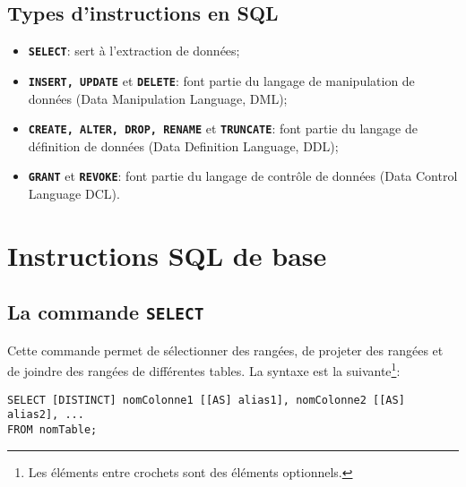 \documentclass[a4paper, 12pt]{report}
\newcommand{\textSQL}[1]{\texttt{\textbf{#1}}}
\theoremstyle{definition} \newtheorem{ex}{Exemple}
\begin{document}
\section[Instructions]{Types d'instructions en SQL}
\begin{itemize}
\item \textSQL{SELECT}: sert à l'extraction de données;
\item \textSQL{INSERT, UPDATE} et \textSQL{DELETE}: font partie du langage de manipulation de données (Data Manipulation Language, DML);
\item \textSQL{CREATE, ALTER, DROP, RENAME} et \textSQL{TRUNCATE}: font partie du langage de définition de données (Data Definition Language, DDL);
\item \textSQL{GRANT} et \textSQL{REVOKE}: font partie du langage de contrôle de données (Data Control Language DCL).
\end{itemize}

\chapter{Instructions SQL de base}
\section{La commande \textSQL{SELECT}}
Cette commande permet de sélectionner des rangées, de projeter des rangées et de joindre des rangées de différentes tables. La syntaxe est la suivante\footnote{Les éléments entre crochets sont des éléments optionnels.}:

\begin{lstlisting}[frame=single]
SELECT [DISTINCT] nomColonne1 [[AS] alias1], nomColonne2 [[AS] alias2], ...
FROM nomTable;
\end{lstlisting}
\end{document}
